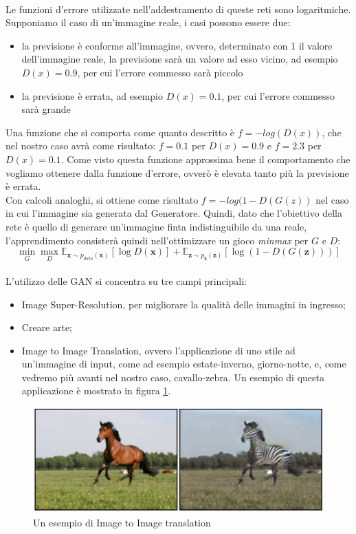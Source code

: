 \\Le funzioni d'errore utilizzate nell'addestramento di queste reti sono logaritmiche. Supponiamo il caso di un'immagine reale, i casi possono essere due:
\begin{itemize}
    \item la previsione è conforme all'immagine, ovvero, determinato con 1 il valore dell'immagine reale, la previsione sarà un valore ad esso vicino, ad esempio $D(x)=0.9$, per cui l'errore commesso sarà piccolo
    \item la previsione è errata, ad esempio $D(x)=0.1$, per cui l'errore commesso sarà grande
\end{itemize}
Una funzione che si comporta come quanto descritto è $f=-log(D(x))$, che nel nostro caso avrà come risultato: $f=0.1$ per $D(x)=0.9$ e $f=2.3$ per $D(x)=0.1$. Come visto questa funzione approssima bene il comportamento che vogliamo ottenere dalla funzione d'errore, ovverò è elevata tanto più la previsione è errata.
\\Con calcoli analoghi, si ottiene come risultato $f=-log(1-D(G(z))$ nel caso in cui l'immagine sia generata dal Generatore. Quindi, dato che l'obiettivo della rete è quello di generare un'immagine finta indistinguibile da una reale, l'apprendimento consisterà quindi nell'ottimizzare un gioco \emph{minmax} per $G$ e $D$:
$$
{\displaystyle \min _{G}\max _{D}\mathbb {E} _{{\boldsymbol {x}}\sim p_{data}({\boldsymbol {x}})}[\log D({\boldsymbol {x}})]+\mathbb {E} _{{\boldsymbol {z}}\sim p_{\boldsymbol {z}}({\boldsymbol {z}})}[\log(1-D(G({\boldsymbol {z}})))]}
$$
\\L'utilizzo delle GAN si concentra su tre campi principali:
\begin{itemize}
    \item Image Super-Resolution, per migliorare la qualità delle immagini in ingresso;
    \item Creare arte;
    \item Image to Image Translation, ovvero l'applicazione di uno stile ad un'immagine di input, come ad esempio estate-inverno, giorno-notte, e, come vedremo più avanti nel nostro caso, cavallo-zebra. Un esempio di questa applicazione è mostrato in figura \ref{fig:HorsetoZebra Example}.
\end{itemize}

\begin{figure}[H]
  \begin{center}
    \includegraphics[width=0.8\columnwidth]{images/cyclegan example.png}
  \end{center}
  \caption{Un esempio di Image to Image translation  \cite{Zhu_2017_ICCV}}
  \label{fig:HorsetoZebra Example}
\end{figure}
